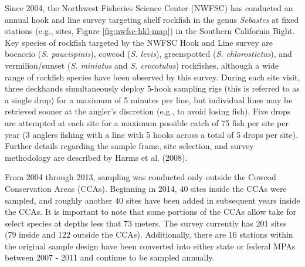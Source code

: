 \documentclass[11pt,
  english,
  letterpaper,
]{article}
\begin{document}
\hfill\break

Since 2004, the Northwest Fisheries Science Center (NWFSC) has conducted an annual hook and line survey targeting shelf rockfish in the genus \emph{Sebastes} at fixed stations (e.g., sites, Figure \ref{fig:nwfsc-hkl-map}) in the Southern California Bight. Key species of rockfish targeted by the NWFSC Hook and Line survey are bocaccio (\emph{S. paucispinis}), cowcod (\emph{S. levis}), greenspotted (\emph{S. chlorostictus}), and vermilion/sunset (\emph{S. miniatus} and \emph{S. crocotulus}) rockfishes, although a wide range of rockfish species have been observed by this survey. During each site visit, three deckhands simultaneously deploy 5-hook sampling rigs (this is referred to as a single drop) for a maximum of 5 minutes per line, but individual lines may be retrieved sooner at the angler's discretion (e.g., to avoid losing fish). Five drops are attempted at each site for a maximum possible catch of 75 fish per site per year (3 anglers fishing with a line with 5 hooks across a total of 5 drops per site). Further details regarding the sample frame, site selection, and survey methodology are described by Harms et al. (2008).

From 2004 through 2013, sampling was conducted only outside the Cowcod Conservation Areas (CCAs). Beginning in 2014, 40 sites inside the CCAs were sampled, and roughly another 40 sites have been added in subsequent years inside the CCAs. It is important to note that some portions of the CCAs allow take for select species at depths less that 73 meters. The survey currently has 201 sites (79 inside and 122 outside the CCAs). Additionally, there are 16 stations within the original sample design have been converted into either state or federal MPAs between 2007 - 2011 and continue to be sampled annually.
\end{document}
